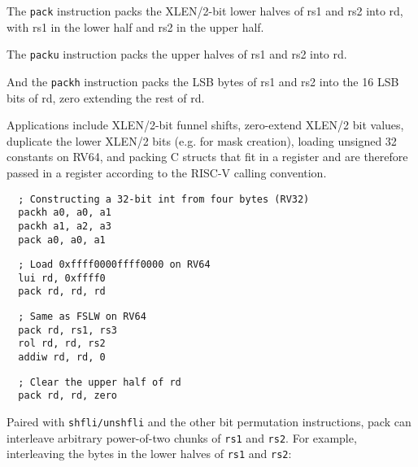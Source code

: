 The {\tt pack} instruction packs the XLEN/2-bit lower halves of rs1 and rs2 into
rd, with rs1 in the lower half and rs2 in the upper half.



The {\tt packu} instruction packs the upper halves of rs1 and rs2 into rd.



And the {\tt packh} instruction packs the LSB bytes of rs1 and rs2 into the 16 LSB bits
of rd, zero extending the rest of rd.



Applications include XLEN/2-bit funnel shifts, zero-extend XLEN/2 bit values, duplicate the lower
XLEN/2 bits (e.g. for mask creation), loading unsigned 32 constants on RV64, and packing
C structs that fit in a register and are therefore passed in a register according to the RISC-V
calling convention.

\begin{minipage}{\linewidth}
\begin{verbatim}
  ; Constructing a 32-bit int from four bytes (RV32)
  packh a0, a0, a1
  packh a1, a2, a3
  pack a0, a0, a1
\end{verbatim}
\end{minipage}

\begin{minipage}{\linewidth}
\begin{verbatim}
  ; Load 0xffff0000ffff0000 on RV64
  lui rd, 0xffff0
  pack rd, rd, rd
\end{verbatim}
\end{minipage}

\begin{minipage}{\linewidth}
\begin{verbatim}
  ; Same as FSLW on RV64
  pack rd, rs1, rs3
  rol rd, rd, rs2
  addiw rd, rd, 0
\end{verbatim}
\end{minipage}

\begin{minipage}{\linewidth}
\begin{verbatim}
  ; Clear the upper half of rd
  pack rd, rd, zero
\end{verbatim}
\end{minipage}

Paired with {\tt shfli/unshfli} and the other bit permutation instructions,
pack can interleave arbitrary power-of-two chunks of {\tt rs1} and {\tt rs2}. For
example, interleaving the bytes in the lower halves of {\tt rs1} and {\tt rs2}:

